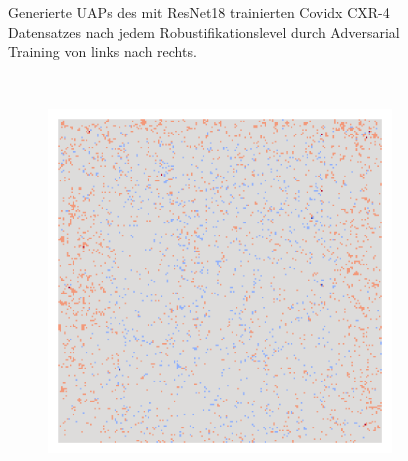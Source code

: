 \begin{figure}[H]
\begin{subfigure}{0.095\linewidth}
    \end{subfigure}
    \caption{Generierte UAPs des mit ResNet18 trainierten Covidx CXR-4 Datensatzes nach jedem Robustifikationslevel durch Adversarial Training von links nach rechts.}
    \label{fig:uap-verlauf-resnet18-covid-robustifikation}
\end{figure}

\begin{figure}[H]
    \centering
     \\
    \begin{subfigure}{0.095\linewidth}
        \centering
        \includegraphics[height=1\linewidth]{01-images/05-resultate/uap_resnet18/uap0-resnet18-mri_data-n200-robustificationslevel0.png}
    \end{subfigure}\hfill%
    \begin{subfigure}{0.095\linewidth}
        \centering

\end{subfigure}
\end{figure}
